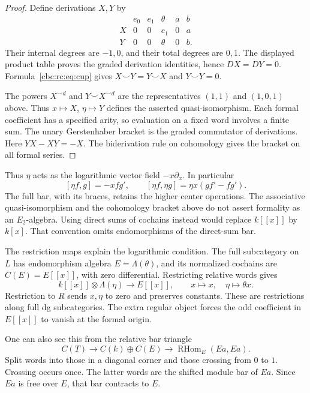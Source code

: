 \begin{proof}
Define derivations \(X,Y\) by
\[
\begin{array}{c|ccccc}
 &e_0&e_1&\theta&a&b\\\hline
 X&0&0&e_1&0&a\\
 Y&0&0&\theta&0&b.
\end{array}
\]
Their internal degrees are \(-1,0\), and their total degrees are
\(0,1\).  The displayed product table proves the graded derivation
identities, hence \(DX=DY=0\).
Formula~\eqref{cbc:rc:eq:cup} gives
\(X\smile Y=Y\smile X\) and \(Y\smile Y=0\).

The powers \(X^{\smile d}\) and \(Y\smile X^{\smile d}\) are the
representatives \((1,1)\) and \((1,0,1)\) above.
Thus \(x\mapsto X\), \(\eta\mapsto Y\) defines the asserted
quasi-isomorphism.  Each formal coefficient has a specified arity, so
evaluation on a fixed word involves a finite sum.
The unary Gerstenhaber bracket is the graded commutator of derivations.
Here \(YX-XY=-X\).  The biderivation rule on cohomology gives the bracket
on all formal series.
\end{proof}

Thus \(\eta\) acts as the logarithmic vector field \(-x\partial_x\).
In particular
\[
 [\eta f,g]=-xf g',\qquad
 [\eta f,\eta g]=\eta x(gf'-fg').
\]
The full bar, with its braces, retains the higher center operations.
The associative quasi-isomorphism and the cohomology bracket above do
not assert formality as an \(E_2\)-algebra.
Using direct sums of cochains instead would replace \(k[[x]]\) by
\(k[x]\). That convention omits endomorphisms of the direct-sum bar.

The restriction maps explain the logarithmic condition.
The full subcategory on \(L\) has endomorphism algebra
\(E=\Lambda(\theta)\), and its normalized cochains are
\(C(E)=E[[x]]\), with zero differential.  Restricting relative words gives
\begin{equation}\label{cbc:rc:eq:restrictions}
 k[[x]]\otimes\Lambda(\eta)\longrightarrow E[[x]],
 \qquad x\longmapsto x,\quad\eta\longmapsto\theta x.
\end{equation}
Restriction to \(R\) sends \(x,\eta\) to zero and preserves constants.
These are restrictions along full dg subcategories.
The extra regular object forces the odd coefficient in \(E[[x]]\)
to vanish at the formal origin.

One can also see this from the relative bar triangle
\[
 C(T)\longrightarrow C(k)\oplus C(E)
 \longrightarrow\operatorname{RHom}_E(Ea,Ea).
\]
Split words into those in a diagonal corner and those crossing from
\(0\) to \(1\).  Crossing occurs once. The latter words are the shifted
module bar of \(Ea\).  Since \(Ea\) is free over \(E\), that bar contracts
to \(E\).

